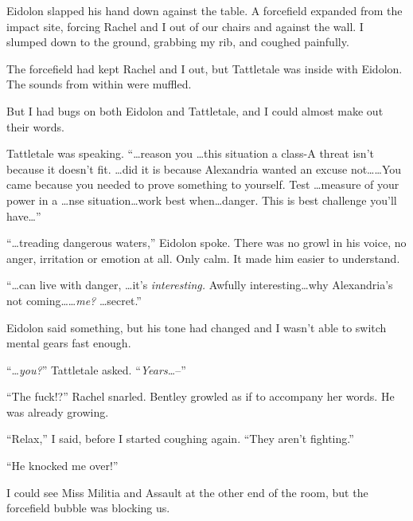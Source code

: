 Eidolon slapped his hand down against the table.  A forcefield expanded from the impact site, forcing Rachel and I out of our chairs and against the wall.  I slumped down to the ground, grabbing my rib, and coughed painfully.



The forcefield had kept Rachel and I out, but Tattletale was inside with Eidolon.  The sounds from within were muffled.



But I had bugs on both Eidolon and Tattletale, and I could almost make out their words.



Tattletale was speaking.  ``\ldots{}reason you \ldots this situation a class-A threat isn't because it doesn't fit.  \ldots{}did it is because Alexandria wanted an excuse not\ldots \ldots  You came because you needed to prove something to yourself.  Test \ldots measure of your power in a \ldots{}nse situation\ldots work best when\ldots danger.  This is best challenge you'll have\ldots''



``\ldots{}treading dangerous waters,'' Eidolon spoke.  There was no growl in his voice, no anger, irritation or emotion at all.  Only calm.  It made him easier to understand.



``\ldots{}can live with danger, \ldots it's \emph{interesting.  }Awfully interesting\ldots why Alexandria's not coming\ldots \ldots \emph{me?}  \ldots{}secret.''



Eidolon said something, but his tone had changed and I wasn't able to switch mental gears fast enough.



``\ldots\emph{you?}''  Tattletale asked. ``\emph{Years\ldots}--''



``The fuck!?'' Rachel snarled.  Bentley growled as if to accompany her words.  He was already growing.



``Relax,'' I said, before I started coughing again.  ``They aren't fighting.''



``He knocked me over!''



I could see Miss Militia and Assault at the other end of the room, but the forcefield bubble was blocking us.



